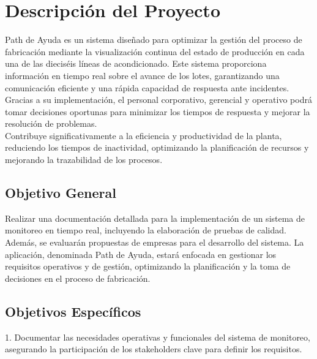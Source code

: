 \documentclass[12pt,letterpaper,spanish, xcolor=table]{report}
\begin{document}
\section{Descripción del Proyecto}

	Path de Ayuda es un sistema diseñado para optimizar la gestión del proceso de fabricación mediante la visualización continua del estado de producción en cada una de las dieciséis líneas de acondicionado. Este sistema proporciona información en tiempo real sobre el avance de los lotes, garantizando una comunicación eficiente y una rápida capacidad de respuesta ante incidentes.\\
	
	Gracias a su implementación, el personal corporativo, gerencial y operativo podrá tomar decisiones oportunas para minimizar los tiempos de respuesta y mejorar la resolución de problemas.\\
	
	Contribuye significativamente a la eficiencia y productividad de la planta, reduciendo los tiempos de inactividad, optimizando la planificación de recursos y mejorando la trazabilidad de los procesos.


\subsection{Objetivo General}

	Realizar una documentación detallada para la implementación de un sistema de monitoreo en tiempo real, incluyendo la elaboración de pruebas de calidad. Además, se evaluarán propuestas de empresas para el desarrollo del sistema. La aplicación, denominada Path de Ayuda, estará enfocada en gestionar los requisitos operativos y de gestión, optimizando la planificación y la toma de decisiones en el proceso de fabricación.


\subsection{Objetivos Específicos}

	1. Documentar las necesidades operativas y funcionales del sistema de monitoreo, asegurando la participación de los stakeholders clave para definir los requisitos.\\
	
\end{document}
